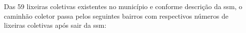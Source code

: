 Das 59 lixeiras coletivas existentes no município e conforme descrição da \gls{ssm}, o caminhão coletor passa pelos seguintes bairros com respectivos números de lixeiras coletivas após sair da \gls{ssm}:

